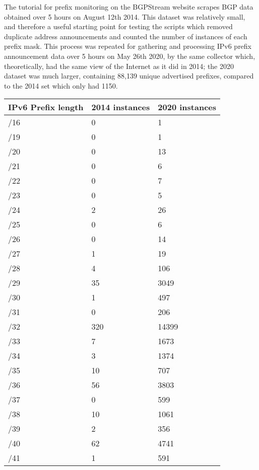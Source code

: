 \documentclass[10pt,sigconf]{acmart}
\begin{document}
The tutorial for prefix monitoring on the BGPStream website scrapes BGP data obtained over 5 hours on August 12th 2014.
This dataset was relatively small, and therefore a useful starting point for testing the scripts which removed duplicate address announcements and counted the number of instances of each prefix mask.
This process was repeated for gathering and processing IPv6 prefix announcement data over 5 hours on May 26th 2020, by the same collector which, theoretically, had the same view of the Internet as it did in 2014;
the 2020 dataset was much larger, containing 88,139 unique advertised prefixes, compared to the 2014 set which only had 1150.
\begin{table}[]
\centering
\label{ipv6-scanning}
\begin{center}
	\begin{tabular}{|l|l|l|}
		\hline
		IPv6 Prefix length & 2014 instances & 2020 instances   \\ \hline
		/16 & 0 & 1   \\ \hline
		/19 & 0 & 1   \\ \hline
		/20 & 0 & 13   \\ \hline
		/21 & 0 & 6  \\ \hline
		/22 & 0 & 7   \\ \hline
		/23 & 0 & 5   \\ \hline
		/24 & 2 & 26   \\ \hline
		/25 & 0 & 6   \\ \hline
		/26 & 0 & 14   \\ \hlinie
		/27 & 1 & 19   \\ \hline
		/28 & 4 & 106   \\ \hline
		/29 & 35 & 3049   \\ \hline
		/30 & 1 & 497   \\ \hline
		/31 & 0 & 206   \\ \hline
		/32 & 320 & 14399   \\ \hline
		/33 & 7 & 1673   \\ \hline
		/34 & 3 & 1374   \\ \hline
		/35 & 10 & 707   \\ \hline
		/36 & 56 & 3803   \\ \hline
		/37 & 0 & 599   \\ \hline
		/38 & 10 & 1061   \\ \hline
		/39 & 2 & 356   \\ \hline
		/40 & 62 & 4741   \\ \hline
		/41 & 1 & 591   \\ \hline

\end{tabular}
\end{center}
\end{table}
\end{document}
